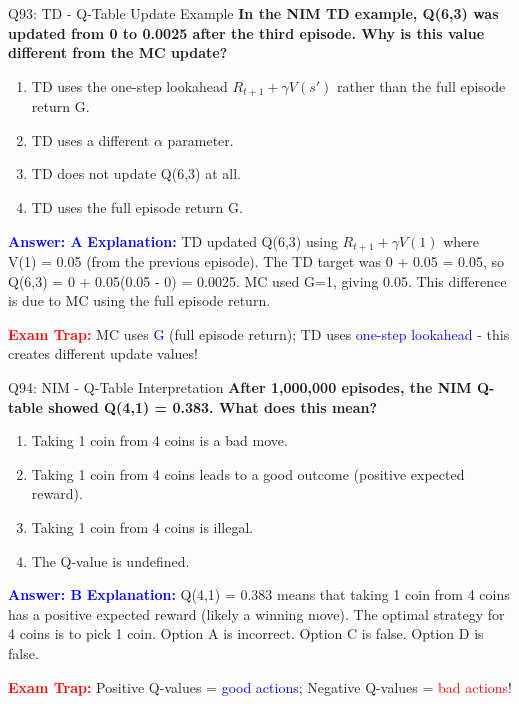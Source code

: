 \documentclass[8pt]{beamer}
\begin{document}
	\begin{frame}{Q93: TD - Q-Table Update Example}
		\fontsize{6.5}{7.5}\selectfont
		\textbf{In the NIM TD example, Q(6,3) was updated from 0 to 0.0025 after the third episode. Why is this value different from the MC update?}
		
		\begin{enumerate}
			\item TD uses the one-step lookahead $R_{t+1} + \gamma V(s')$ rather than the full episode return G.
			\item TD uses a different $\alpha$ parameter.
			\item TD does not update Q(6,3) at all.
			\item TD uses the full episode return G.
		\end{enumerate}
		
		\vspace{0.1cm}
		\textcolor{blue}{\textbf{Answer: A}}
		\vspace{0.1cm}
		\textcolor{blue}{\textbf{Explanation:}} TD updated Q(6,3) using $R_{t+1} + \gamma V(1)$ where V(1) = 0.05 (from the previous episode). The TD target was 0 + 0.05 = 0.05, so Q(6,3) = 0 + 0.05(0.05 - 0) = 0.0025. MC used G=1, giving 0.05. This difference is due to MC using the full episode return.
		
		\textcolor{red}{\textbf{Exam Trap:}} MC uses \textcolor{blue}{G} (full episode return); TD uses \textcolor{blue}{one-step lookahead} - this creates different update values!
	\end{frame}
	
	\begin{frame}{Q94: NIM - Q-Table Interpretation}
		\fontsize{6.5}{7.5}\selectfont
		\textbf{After 1,000,000 episodes, the NIM Q-table showed Q(4,1) = 0.383. What does this mean?}
		
		\begin{enumerate}
			\item Taking 1 coin from 4 coins is a bad move.
			\item Taking 1 coin from 4 coins leads to a good outcome (positive expected reward).
			\item Taking 1 coin from 4 coins is illegal.
			\item The Q-value is undefined.
		\end{enumerate}
		
		\vspace{0.1cm}
		\textcolor{blue}{\textbf{Answer: B}}
		\vspace{0.1cm}
		\textcolor{blue}{\textbf{Explanation:}} Q(4,1) = 0.383 means that taking 1 coin from 4 coins has a positive expected reward (likely a winning move). The optimal strategy for 4 coins is to pick 1 coin. Option A is incorrect. Option C is false. Option D is false.
		
		\textcolor{red}{\textbf{Exam Trap:}} Positive Q-values = \textcolor{blue}{good actions}; Negative Q-values = \textcolor{red}{bad actions}!
	\end{frame}
	
\end{document}
